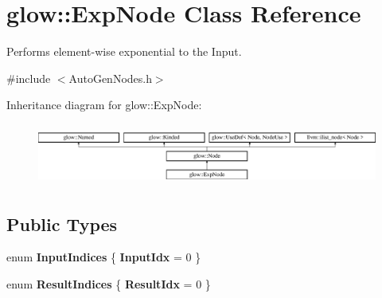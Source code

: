 \hypertarget{classglow_1_1_exp_node}{}\section{glow\+:\+:Exp\+Node Class Reference}
\label{classglow_1_1_exp_node}


Performs element-\/wise exponential to the Input.  




{\ttfamily \#include $<$Auto\+Gen\+Nodes.\+h$>$}

Inheritance diagram for glow\+:\+:Exp\+Node\+:\begin{figure}[H]
\begin{center}
\leavevmode
\includegraphics[height=2.028986cm]{classglow_1_1_exp_node}
\end{center}
\end{figure}
\subsection*{Public Types}
\begin{DoxyCompactItemize}
\item 
\mbox{\label{classglow_1_1_exp_node_a981b64ee33d9af743c334c6de3cba0be}} 
enum {\bfseries Input\+Indices} \{ {\bfseries Input\+Idx} = 0
 \}
\item 
\mbox{\label{classglow_1_1_exp_node_ac80b13254cf41696f5881220348887b9}} 
enum {\bfseries Result\+Indices} \{ {\bfseries Result\+Idx} = 0
 \}
\end{DoxyCompactItemize}
